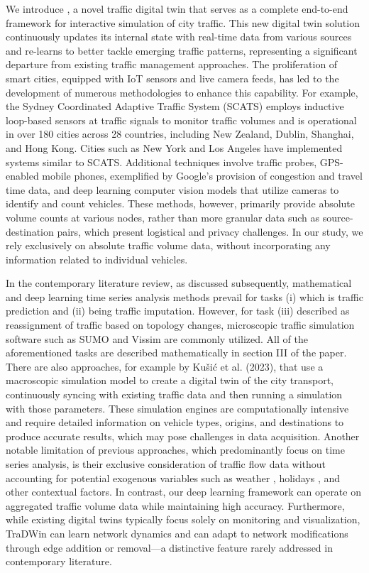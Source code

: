 We introduce \name, a novel traffic digital twin that serves as a complete end-to-end framework for interactive simulation of city traffic. This new digital twin solution continuously updates its internal state with real-time data from various sources and re-learns to better tackle emerging traffic patterns, representing a significant departure from existing traffic management approaches. The proliferation of smart cities, equipped with IoT sensors and live camera feeds, has led to the development of numerous methodologies to enhance this capability. For example, the Sydney Coordinated Adaptive Traffic System (SCATS)\cite{scats} employs inductive loop-based sensors at traffic signals to monitor traffic volumes and is operational in over 180 cities across 28 countries, including New Zealand, Dublin, Shanghai, and Hong Kong\cite{wiki:sydney_traffic_system}. Cities such as New York and Los Angeles have implemented systems similar to SCATS. Additional techniques involve traffic probes\cite{zhu2012probe}, GPS-enabled mobile phones\cite{rose2006mobile}, exemplified by Google’s provision of congestion and travel time data, and deep learning computer vision models that utilize cameras to identify and count vehicles. These methods, however, primarily provide absolute volume counts at various nodes, rather than more granular data such as source-destination pairs, which present logistical and privacy challenges. In our study, we rely exclusively on absolute traffic volume data, without incorporating any information related to individual vehicles.

In the contemporary literature review, as discussed subsequently, mathematical and deep learning time series analysis methods prevail for tasks (i) which is traffic prediction and (ii) being traffic imputation. However, for task (iii) described as reassignment of traffic based on topology changes, microscopic traffic simulation software such as SUMO \cite{sumo} and Vissim \cite{vissim} are commonly utilized. All of the aforementioned tasks are described mathematically in section III of the paper. There are also approaches, for example by Kušić et al. (2023)\cite{kusic2023digital}, that use a macroscopic simulation model to create a digital twin of the city transport, continuously syncing with existing traffic data and then running a simulation with those parameters. These simulation engines are computationally intensive and require detailed information on vehicle types, origins, and destinations to produce accurate results, which may pose challenges in data acquisition. Another notable limitation of previous approaches, which predominantly focus on time series analysis, is their exclusive consideration of traffic flow data without accounting for potential exogenous variables such as weather \cite{weather}, holidays \cite{holiday}, and other contextual factors.
In contrast, our deep learning framework can operate on aggregated traffic volume data while maintaining high accuracy. Furthermore, while existing digital twins typically focus solely on monitoring and visualization, TraDWin can learn network dynamics and can adapt to network modifications through edge addition or removal—a distinctive feature rarely addressed in contemporary literature.

